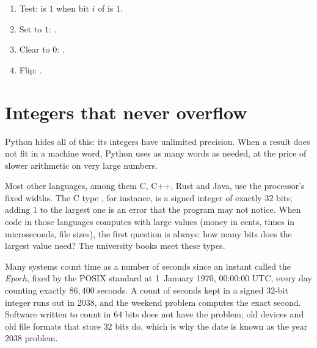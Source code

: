 \begin{method}\label{met:g10:machine-integers:bit-ops}
\begin{enumerate}
  \item Test:  is $1$ when bit $i$ of  is $1$.
  \item Set to $1$: .
  \item Clear to $0$: .
  \item Flip: .
\end{enumerate}
\end{method}

\section{Integers that never overflow}\label{sec:g10:machine-integers:python-int}

Python hides all of this: its integers have unlimited precision. When a result does not fit in a machine word,
Python uses as many words as needed, at the price of slower arithmetic on very large numbers.

\label{lst:g10:machine-integers:big-int}

\label{out:g10:machine-integers:big-int}

\begin{inpractice}
Most other languages, among them C, C++, Rust and Java, use the processor's fixed widths. The C type
, for instance, is a signed integer of exactly $32$ bits; adding $1$ to the largest one is an error
that the program may not notice. When code in
those languages computes with large values (money in cents, times in microseconds, file sizes), the first question
is always: how many bits does the largest value need? The university books meet these types.
\end{inpractice}

\begin{history}
Many systems count time as a number of seconds since an instant called the \emph{Epoch}, fixed by the POSIX
standard at 1~January 1970, 00:00:00 UTC, every day counting exactly $86{,}400$ seconds. A count of seconds kept in a
signed $32$-bit integer runs out in 2038, and the weekend problem computes the exact second. Software written to
count in $64$ bits does not have the problem; old devices and old file formats that store $32$ bits do, which is why
the date is known as the year 2038 problem.
\end{history}

